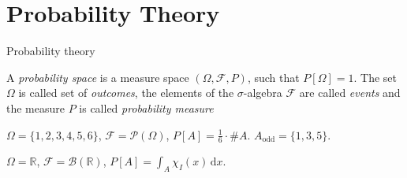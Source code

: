 \documentclass[compress]{beamer}
\newcommand{\RR}{\mathbb{R}}
\newcommand{\td}{\,\mathrm{d}}  %
\begin{document}

\section{Probability Theory}

\begin{frame}{Probability theory}
  \begin{definition}
    A \textit{probability space} is a measure space $(\Omega, \mathcal{F}, P)$,
    such that $P[\Omega]=1$.  The set $\Omega$ is called set of
    \textit{outcomes}, the elements of the $\sigma$-algebra $\mathcal{F}$ are
    called \textit{events} and the measure $P$ is called \textit{probability
      measure}
  \end{definition}
  \pause
  \begin{example}
    $\Omega=\{1,2,3,4,5,6\}$, $\mathcal{F} = \mathcal{P}(\Omega)$, $P[A] =
    \frac16\cdot \#A$. $A_{\text{odd}}=\{1,3,5\}$.
  \end{example}

  \begin{example}[Uniform on $I$]
    $\Omega=\RR$, $\mathcal{F} = \mathcal{B}(\RR)$, $P[A] = \int_A \chi_I(x)\td
    x$.
  \end{example}
\end{frame}
\end{document}
